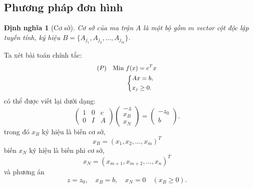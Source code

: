 \documentclass[12pt,a4paper]{report}
\newtheorem{dn}{Định nghĩa}
\begin{document}
\subsection{Phương pháp đơn hình}
\begin{dn}[Cơ sở]
    Cơ sở của ma trận $A$ là một bộ gồm $m$ vector cột độc lập tuyến tính, ký hiệu $B=\{A_{j_1}, A_{j_2}, \ldots , A_{j_m}\}$.
\end{dn}

Ta xét bài toán chính tắc:
    \begin{equation} \small \label{chinhtac}
        \begin{split}
        (P) \quad \text{Min } & f(x) = c^Tx \\
            & \left\{
            \begin{split}
            & Ax=b, \\
            & x_j \geq 0.
            \end{split}
            \right.    
        \end{split}
    \end{equation}
có thể được viết lại dưới dạng:
\begin{equation}
\begin{pmatrix}
    1 & 0 & c \\
    0 & I & A
\end{pmatrix}
\begin{pmatrix}
    -z \\
    x_B \\
    x_N
\end{pmatrix}
=
\begin{pmatrix}
    -z_0 \\
    b
\end{pmatrix}.
\end{equation}
trong đó $x_B$ ký hiệu là biến cơ sở,
\begin{equation}
x_B=(x_1,x_2,\ldots,x_m)^T
\end{equation}
biến $x_N$ ký hiệu là biến phi cơ sở,
\begin{equation}
x_N=(x_{m+1},x_{m+2},\ldots,x_n)^T
\end{equation}
và phương án
\begin{equation}
z=z_0, \quad x_B=b, \quad x_N=0 \quad (x_B \geq 0).
\end{equation}
\end{document}
